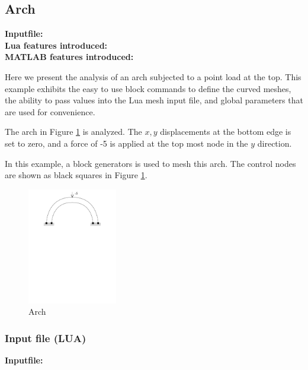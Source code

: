 \subsection{Arch}
\begin{flushleft}
  \textbf{Inputfile:}
  \\
  \textbf{Lua features introduced:}
  \\
  \textbf{MATLAB features introduced:}
\end{flushleft}
Here we present the analysis of an arch subjected
to a point load at the top. This example exhibits
the easy to use block commands to define the curved meshes,
the ability to pass values into the Lua mesh input file, and 
global parameters that are used for convenience. 

The arch in Figure \ref{fig:Arch} is analyzed. 
The $x,y$ displacements at the bottom edge is set to zero, and
a force of -5 is applied at the top most node in the $y$ direction. 

In this example, a block generators is used  to mesh this arch.
The control nodes are shown as black squares in  Figure 
\ref{fig:Arch}.

\begin{figure}[htbp]
  \centering
  \includegraphics[trim = 1in 5.5in 1in 0cm, clip, height=2in]{fig/arch.pdf}
  \caption{Arch}
  \label{fig:Arch}
\end{figure}

\clearpage
\subsubsection*{Input file (LUA)}
\begin{flushleft}
  \textbf{Inputfile:}
  \\
\end{flushleft}
\hspace{1in}
{\footnotesize
{}
}

